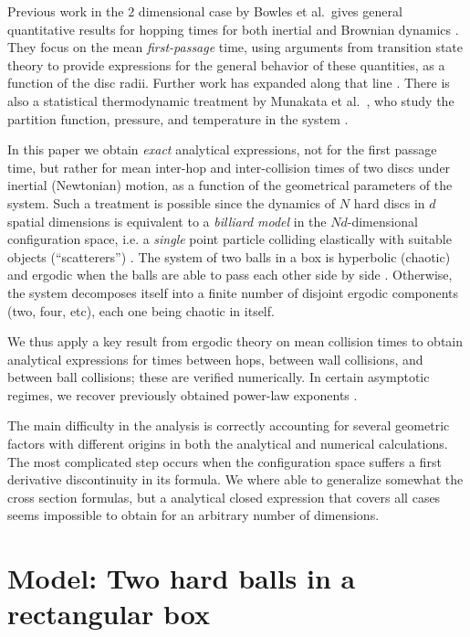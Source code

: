\documentclass[superscriptaddress,pre,reprint,showpacs,twocolumn]{revtex4-1}
\newcommand{\etal}{et al.\ }
\begin{document}
 
Previous work in the 2 dimensional case
by Bowles \etal gives general quantitative results for hopping times 
for both inertial and Brownian dynamics \cite{Bowles04}. They focus
on the mean \emph{first-passage} time, using arguments from transition state theory 
to provide expressions for the general behavior of these quantities, as a function of the
disc radii. %
Further work has expanded along that line  \cite{Suh05, Ball09}.
There is also a statistical thermodynamic treatment by Munakata \etal, 
who study the partition function, pressure,
and temperature in the system \cite{Munakata02, Munakata06}. 


In this paper we obtain \emph{exact} analytical expressions, not for the first passage time,
but rather for mean inter-hop and inter-collision times of two discs under 
inertial (Newtonian) motion, as a function of the geometrical parameters of the system. Such a treatment is possible
 since the dynamics of $N$ hard discs in $d$ spatial dimensions
 is equivalent to a \emph{billiard model} in the $Nd$-dimensional configuration space, i.e. a \emph{single} point particle colliding elastically 
with suitable objects (``scatterers'') \cite{SzaszBook00}. 
The system of two balls in a box is hyperbolic (chaotic) and ergodic when the balls are able to pass each other side by side \cite{Sim99}.
Otherwise, the system decomposes itself into
a finite number of disjoint ergodic components (two, four, etc),
each one being chaotic in itself.

We thus apply a key result from ergodic theory on mean collision times \cite{Chernov97} to obtain analytical expressions 
for times between hops, between wall collisions, and between ball collisions; these are verified numerically. 
In certain asymptotic regimes, we recover previously obtained power-law exponents \cite{Bowles04}.

The main difficulty in the analysis is correctly accounting for several geometric factors with different origins in both the
analytical and numerical calculations. The most complicated step occurs when the configuration space
suffers a first derivative discontinuity in its formula. We where able to generalize somewhat
the cross section formulas, but a analytical closed expression that covers all cases seems
impossible to obtain for an arbitrary number of dimensions. 



\section{Model: Two hard balls in a rectangular box}
\end{document}
